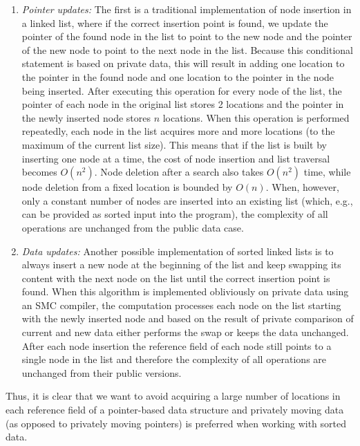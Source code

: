 \documentclass[11pt]{article}
\begin{document}
\begin{enumerate}
\item \emph{Pointer updates:} The first is a traditional implementation of
  node insertion in a linked list, where if the correct insertion point is
  found, we update the pointer of the found node in the list to point to the
  new node and the pointer of the new node to point to the next node in the
  list. Because this conditional statement is based on private data, this
  will result in adding one location to the pointer in the found node and
  one location to the pointer in the node being inserted. After executing
  this operation for every node of the list, the pointer of each node in the
  original list stores 2 locations and the pointer in the newly inserted
  node stores $n$ locations. When this operation is performed repeatedly,
  each node in the list acquires more and more locations (to the maximum of
  the current list size). This means that if the list is built by inserting
  one node at a time, the cost of node insertion and list traversal becomes
  $O(n^2)$. Node deletion after a search also takes $O(n^2)$ time, while
  node deletion from a fixed location is bounded by $O(n)$. When, however,
  only a constant number of nodes are inserted into an existing list (which,
  e.g., can be provided as sorted input into the program), the complexity of
  all operations are unchanged from the public data case.

\item \emph{Data updates:} Another possible implementation of sorted linked
  lists is to always insert a new node at the beginning of the list and keep
  swapping its content with the next node on the list until the correct
  insertion point is found. When this algorithm is implemented obliviously
  on private data using an SMC compiler, the computation processes each node
  on the list starting with the newly inserted node and based on the result
  of private comparison of current and new data either performs the swap or
  keeps the data unchanged. After each node insertion the reference field
  of each node still points to a single node in the list and therefore
  the complexity of all operations are unchanged from their public versions.
\end{enumerate}
Thus, it is clear that we want to avoid acquiring a large number of
locations in each reference field of a pointer-based data structure and
privately moving data (as opposed to privately moving pointers) is preferred
when working with sorted data.
\end{document}
